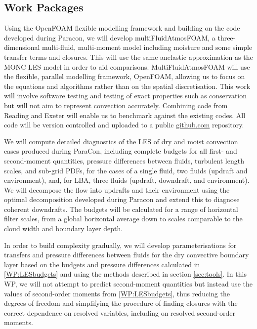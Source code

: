 \documentclass[11pt,a4paper]{article}
\begin{document}
\subsection{Work Packages}
\label{sec:WPs}


Using the OpenFOAM flexible modelling framework and building on the code developed during Paracon, we will develop multiFluidAtmosFOAM, a three-dimensional multi-fluid, multi-moment model including moisture and some simple transfer terms and closures. This will use the same anelastic approximation as the MONC LES model in order to aid comparisons. MultiFluidAtmosFOAM will use the flexible, parallel modelling framework, OpenFOAM, allowing us to focus on the equations and algorithms rather than on the spatial discretisation. This work will involve software testing and testing of exact properties such as conservation but will not aim to represent convection accurately. Combining code from Reading and Exeter will enable us to benchmark against the existing codes. All code will be version controlled and uploaded to a public \url{github.com} repository. 


We will compute detailed diagnostics of the LES of dry and moist convection cases produced during ParaCon, including complete budgets for all first- and second-moment quantities, pressure differences between fluids, turbulent length scales, and sub-grid PDFs, for the cases of a single fluid, two fluids (updraft and environment), and, for LBA, three fluids (updraft, downdraft, and environment).
We will decompose the flow into updrafts and their environment using the optimal decomposition developed during Paracon and extend this to diagnose coherent downdrafts. The budgets will be calculated for a range of horizontal filter scales, from a global horizontal average down to scales comparable to the cloud width and boundary layer depth.



In order to build complexity gradually, we will develop parameterisations for transfers and pressure differences between fluids for the dry convective boundary layer based on the budgets and pressure differences calculated in \ref{WP:LESbudgets} and using the methods described in section \ref{sec:tools}. In this WP, we will not attempt to predict second-moment quantities but instead use the values of second-order moments from \ref{WP:LESbudgets}, thus reducing the degrees of freedom and simplifying the procedure of finding closures with the correct dependence on resolved variables, including on resolved second-order moments. 
\end{document}
